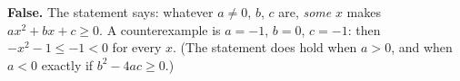 \textbf{False.} The statement says: whatever $a\ne0$, $b$, $c$ are, \emph{some} $x$ makes $ax^2+bx+c\ge0$. A counterexample is $a=-1$, $b=0$, $c=-1$: then $-x^2-1\le-1<0$ for every $x$. (The statement does hold when $a>0$, and when $a<0$ exactly if $b^2-4ac\ge0$.)
